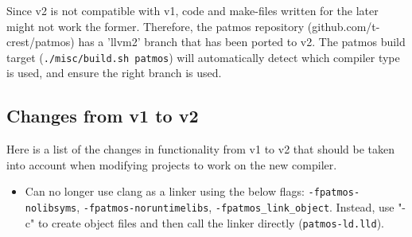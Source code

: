 Since v2 is not compatible with v1, code and make-files written for the later might not work the former.
Therefore, the patmos repository (github.com/t-crest/patmos) has a 'llvm2' branch that has been ported to v2.
The patmos build target (\texttt{./misc/build.sh patmos}) will automatically detect which compiler type is used, and ensure the right branch is used.

\subsection{Changes from v1 to v2}

Here is a list of the changes in functionality from v1 to v2 that should be taken into account when modifying projects to work on the new compiler.

\begin{itemize}
	\item Can no longer use clang as a linker using the below flags: \texttt{-fpatmos-nolibsyms}, \texttt{-fpatmos-noruntimelibs}, \texttt{-fpatmos\_link\_object}. Instead, use "-c" to create object files and then call the linker directly (\texttt{patmos-ld.lld}).
	

\end{itemize}
